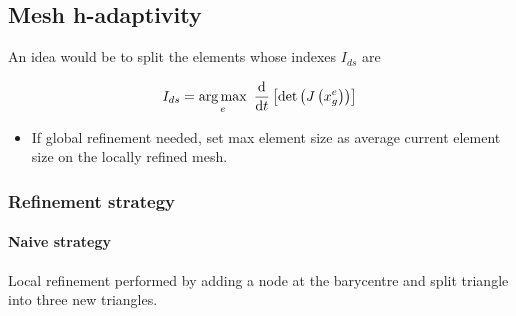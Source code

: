 \subsection{Mesh h-adaptivity}

An idea would be to split the elements whose indexes $I_{ds}$ are

\begin{equation}
	I_{ds} = \operatorname*{arg\,max}_{e}~\frac{\mathrm{d}}{\mathrm{d}t} \left[ \text{det}\left(J\left(x^e_g\right)\right)\right]
\end{equation}

\begin{itemize}
	\item If global refinement needed, set max element size as average current element size on the locally refined mesh.
\end{itemize}


\subsubsection{Refinement strategy}

\paragraph{Naive strategy} Local refinement performed by adding a node at the barycentre and split triangle into three new triangles. 


